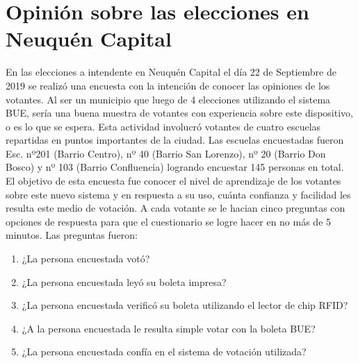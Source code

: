 \section{Opinión sobre las elecciones en Neuquén Capital}
En las elecciones a intendente en Neuquén Capital el día 22 de Septiembre de 2019 se realizó una encuesta con la intención de conocer las opiniones de los votantes. Al ser un municipio que luego de 4 elecciones utilizando el sistema BUE, sería una buena muestra de votantes con experiencia sobre este dispositivo, o es lo que se espera. Esta actividad involucró votantes de cuatro escuelas repartidas en puntos importantes de la ciudad. Las escuelas encuestadas fueron Esc. nº201 (Barrio Centro), nº 40 (Barrio San Lorenzo), nº 20 (Barrio Don Bosco) y nº 103 (Barrio Confluencia) logrando encuestar 145 personas en total. \newline
El objetivo de esta encuesta fue conocer el nivel de aprendizaje de los votantes sobre este nuevo sistema y en respuesta a su uso, cuánta confianza y facilidad les resulta este medio de votación. A cada votante se le hacian cinco preguntas con opciones de respuesta para que el cuestionario se logre hacer en no más de 5 minutos. Las preguntas fueron:
\begin{enumerate}
    \item ¿La persona encuestada votó?
    \item ¿La persona encuestada leyó su boleta impresa?
    \item ¿La persona encuestada verificó su boleta utilizando el lector de chip RFID?
    \item ¿A la persona encuestada le resulta simple votar con la boleta BUE?
    \item ¿La persona encuestada confía en el sistema de votación utilizada?
\end{enumerate}

